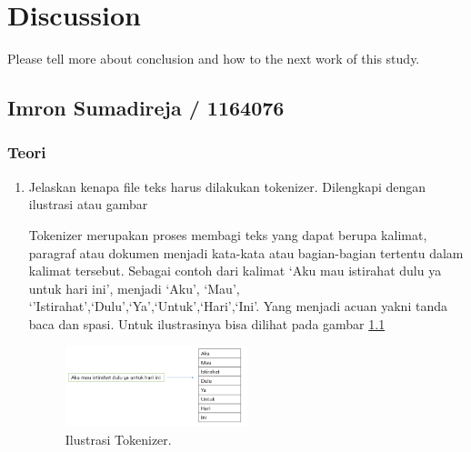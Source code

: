 \chapter{Discussion}
Please tell more about conclusion and how to the next work of this study.

\section{Imron Sumadireja / 1164076}
\subsection{Teori}
\begin{enumerate}
\item Jelaskan kenapa file teks harus dilakukan tokenizer. Dilengkapi dengan ilustrasi atau gambar \par
Tokenizer merupakan proses membagi teks yang dapat berupa kalimat, paragraf atau dokumen menjadi kata-kata atau bagian-bagian tertentu dalam kalimat tersebut. Sebagai contoh dari kalimat `Aku mau istirahat dulu ya untuk hari ini', menjadi `Aku', `Mau', `'Istirahat',`Dulu',`Ya',`Untuk',`Hari',`Ini'. Yang menjadi acuan yakni tanda baca dan spasi. Untuk ilustrasinya bisa dilihat pada gambar \ref{toke1}
		\begin{figure}[!htbp]
		\centerline{\includegraphics[width=0.5\textwidth]{figures/im/toke1.png}}
		\caption{Ilustrasi Tokenizer.}
		\label{toke1}
		\end{figure}

\end{enumerate}
